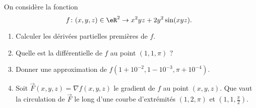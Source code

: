 
\begin{exercice}\label{exoOutilsMath-0095}
    
    On considère la fonction 
    \begin{equation}
        f\colon (x,y,z)\in\eR^2\to x^2yz+2y^2\sin(xyz).
    \end{equation}
    \begin{enumerate}
        \item
            Calculer les dérivées partielles premières de $f$.
        \item
            Quelle est la différentielle de $f$ au point $(1,1,\pi)$ ?
        \item
            Donner une approximation de $f(1+10^{-2},1-10^{-3},\pi+10^{-4})$.
        \item
            Soit $\overrightarrow{F}(x,y,z)=\nabla f(x,y,z)$ le gradient de $f$ au point $(x,y,z)$. Que vaut la circulation de $\overrightarrow{F}$ le long d'une courbe d'extrémités $(1,2,\pi)$ et $(1,1,\frac{ \pi }{ 2 })$.
    \end{enumerate}

\end{exercice}
